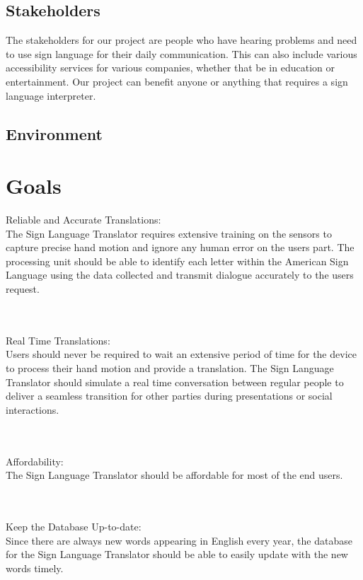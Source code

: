 \documentclass{article}
\begin{document}
\subsection{Stakeholders}

The stakeholders for our project are people who have hearing problems and need to use sign language for their daily
communication. This can also include various accessibility services for various companies, whether that be in education
or entertainment. Our project can benefit anyone or anything that requires a sign language interpreter.

\subsection{Environment}


\section{Goals}

Reliable and Accurate Translations:\\
The Sign Language Translator requires extensive training on the sensors to capture precise hand motion and ignore any
human error on the user\textquotesingle s part. The processing unit should be able to identify each letter within the American Sign Language
using the data collected and transmit dialogue accurately to the user\textquotesingle s request.

\\
\\Real Time Translations:\\
User\textquotesingle s should never be required to wait an extensive period of time for the device to process their hand motion and provide
a translation. The Sign Language Translator should simulate a real time conversation between regular people to deliver a seamless
transition for other parties during presentations or social interactions.

\\
\\Affordability:\\
The Sign Language Translator should be affordable for most of the end users. 

\\
\\Keep the Database Up-to-date:\\
Since there are always new words appearing in English every year, the database for the Sign Language Translator should be able to
easily update with the new words timely.
\end{document}
